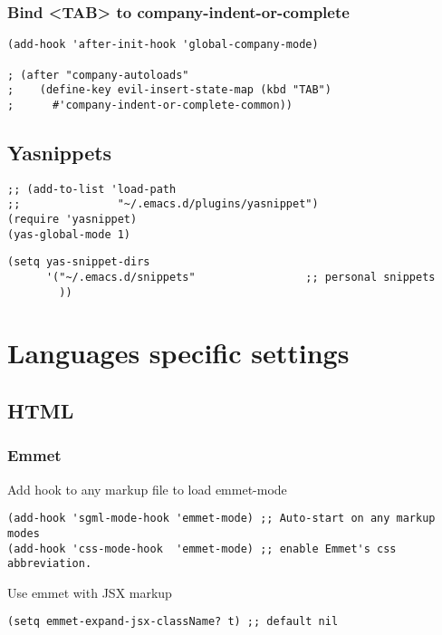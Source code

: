 \documentclass[11pt]{article}
\begin{document}
\subsubsection*{Bind <TAB> to company-indent-or-complete}
\label{sec:orgca01115}
\begin{verbatim}
(add-hook 'after-init-hook 'global-company-mode)

; (after "company-autoloads"
;    (define-key evil-insert-state-map (kbd "TAB")
;      #'company-indent-or-complete-common))
\end{verbatim}


\subsection*{Yasnippets}
\label{sec:org6be2ddd}

\begin{verbatim}
;; (add-to-list 'load-path
;;               "~/.emacs.d/plugins/yasnippet")
(require 'yasnippet)
(yas-global-mode 1)
\end{verbatim}

\begin{verbatim}
(setq yas-snippet-dirs
      '("~/.emacs.d/snippets"                 ;; personal snippets
        ))
\end{verbatim}


\section*{Languages specific settings}
\label{sec:orge6631cb}

\subsection*{HTML}
\label{sec:orga73352f}

\subsubsection*{Emmet}
\label{sec:org62db3f0}


Add hook to any markup file to load emmet-mode
\begin{verbatim}
(add-hook 'sgml-mode-hook 'emmet-mode) ;; Auto-start on any markup modes
(add-hook 'css-mode-hook  'emmet-mode) ;; enable Emmet's css abbreviation. 
\end{verbatim}

Use emmet with JSX markup

\begin{verbatim}
(setq emmet-expand-jsx-className? t) ;; default nil
\end{verbatim}
\end{document}
